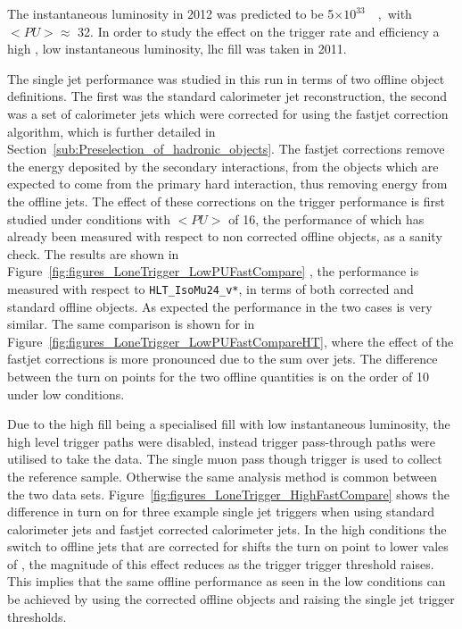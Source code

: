 The instantaneous luminosity in 2012 was predicted to be \unit{5$\times 10 ^{33}$}{\lumiunits}, with $<PU> \approx$ 32. In order to study the effect on the trigger rate and efficiency a high \pu, low instantaneous luminosity, \ac{lhc} fill was taken in 2011.

The \Lone single jet performance was studied in this run in terms of two 
offline object definitions. The first was the standard \AK calorimeter jet 
reconstruction, the second was a set of \AK calorimeter jets which were 
corrected for \pu using the fastjet correction algorithm, which is further 
detailed in Section~\ref{sub:Preselection_of_hadronic_objects}.
The fastjet corrections remove the energy deposited by the secondary 
interactions, from the objects which are expected to come from the primary hard 
interaction, thus removing energy from the offline jets.
The effect of these \pu corrections on the \Lone trigger performance is 
first studied under conditions with $<PU>$ of 16, the performance of which has 
already been measured with respect to non \pu corrected offline objects, as 
a sanity check. The results are shown in 
Figure~\ref{fig:figures_LoneTrigger_LowPUFastCompare} , the performance is 
measured with respect to \verb|HLT_IsoMu24_v*|, in terms of both \pu 
corrected and standard offline objects. As expected the performance in the two 
cases is very similar. The same comparison is shown for \HT in 
Figure~\ref{fig:figures_LoneTrigger_LowPUFastCompareHT}, where the effect of 
the fastjet corrections is more pronounced due to the 
sum over jets. The difference between the turn on points for the two offline 
quantities is on the order of \unit{10}{\GeV} under low \pu conditions.

Due to the high \pu fill being a specialised fill with low instantaneous 
luminosity, the high level trigger paths were disabled, instead \Lone trigger 
pass-through paths were utilised to take the data. The \Lone single muon pass 
though trigger is used to collect the reference sample. Otherwise the same 
analysis method is common between the two data sets.
Figure~\ref{fig:figures_LoneTrigger_HighFastCompare} shows the difference in 
turn on for three example \Lone single jet triggers when using standard 
calorimeter jets and fastjet corrected calorimeter jets.
In the high \pu conditions the switch to offline jets that are corrected 
for \pu shifts the turn on point to lower vales of \ET, the magnitude of 
this effect reduces as the \Lone trigger trigger threshold raises. This implies 
that the same offline performance as seen in the low \pu conditions can be 
achieved by using the \pu corrected offline objects and raising the \Lone 
single jet trigger thresholds.


